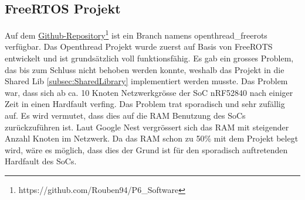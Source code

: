 \subsection{FreeRTOS Projekt}\label{susec:FreeRTOS Projek}
Auf dem \href{https://github.com/Rouben94/P6_Software}{Github-Repository\footnote{\url{https://github.com/Rouben94/P6_Software}\cite{anklin_bobst_horath_rouben94p6_software_nodate}}} ist ein Branch namens openthread\_freerots verfügbar. Das Openthread Projekt wurde zuerst auf Basis von FreeROTS entwickelt und ist grundsätzlich voll funktionsfähig. Es gab ein grosses Problem, das bis zum Schluss nicht behoben werden konnte, weshalb das Projekt in die Shared Lib \ref{subsec:SharedLibrary} implementiert werden musste. Das Problem war, dass sich ab ca. 10 Knoten Netzwerkgrösse der SoC nRF52840 nach einiger Zeit in einen Hardfault verfing. Das Problem trat sporadisch und sehr zufällig auf. Es wird vermutet, dass dies auf die RAM Benutzung des SoCs zurückzuführen ist. Laut Google Nest vergrössert sich das RAM mit steigender Anzahl Knoten im Netzwerk. Da das RAM schon zu 50\% mit dem Projekt belegt wird, wäre es möglich, dass dies der Grund ist für den sporadisch auftretenden Hardfault des SoCs.
